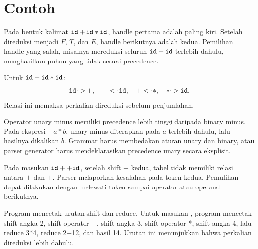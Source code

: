 \section*{Contoh}

\begin{contoh}
Pada bentuk kalimat \(\texttt{id} + \texttt{id} * \texttt{id}\), handle
pertama adalah  paling kiri. Setelah direduksi menjadi
\(F\), \(T\), dan \(E\), handle berikutnya adalah  kedua.
Pemilihan handle yang salah, misalnya mereduksi seluruh
\(\texttt{id} + \texttt{id}\) terlebih dahulu, menghasilkan pohon yang
tidak sesuai precedence.
\end{contoh}

\begin{contoh}
Untuk \(\texttt{id} + \texttt{id} * \texttt{id}\):
\[
\texttt{id} \cdot> +, \quad
+ <\cdot \texttt{id}, \quad
+ <\cdot *, \quad
* \cdot> \texttt{id}.
\]
Relasi ini memaksa perkalian direduksi sebelum penjumlahan.
\end{contoh}

\begin{contoh}
Operator unary minus memiliki precedence lebih tinggi daripada
binary minus. Pada ekspresi \(-a * b\), unary minus diterapkan pada
\(a\) terlebih dahulu, lalu hasilnya dikalikan \(b\). Grammar harus
membedakan aturan unary dan binary, atau parser generator harus
mendeklarasikan precedence unary secara eksplisit.
\end{contoh}

\begin{contoh}
Pada masukan \(\texttt{id} + + \texttt{id}\), setelah shift \(+\) kedua,
tabel tidak memiliki relasi antara \(+\) dan \(+\). Parser
melaporkan kesalahan pada token kedua. Pemulihan dapat dilakukan
dengan melewati token sampai operator atau operand berikutnya.
\end{contoh}

\begin{contoh}
Program  mencetak urutan shift dan reduce.
Untuk masukan , program mencetak shift angka 2, shift
operator +, shift angka 3, shift operator *, shift angka 4, lalu
reduce 3*4, reduce 2+12, dan hasil 14. Urutan ini menunjukkan bahwa
perkalian direduksi lebih dahulu.
\end{contoh}
